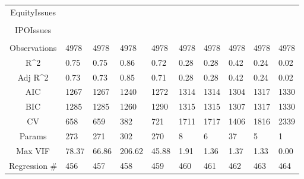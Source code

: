 \documentclass{article}
\begin{document}
\begin{table}[H]
\begin{tabular}{|clllllllll|}
  EquityIssues &  &  &  &  &  &  &  &  &  \\ 
   &  &  &  &  &  &  &  &  &  \\ 
  IPOIssues &  &  &  &  &  &  &  &  &  \\ 
   &  &  &  &  &  &  &  &  &  \\ 
  \hline 
 Observations & 4978 & 4978 & 4978 & 4978 & 4978 & 4978 & 4978 & 4978 & 4978 \\ 
  R^2 & 0.75 & 0.75 & 0.86 & 0.72 & 0.28 & 0.28 & 0.42 & 0.24 & 0.02 \\ 
  Adj R^2 & 0.73 & 0.73 & 0.85 & 0.71 & 0.28 & 0.28 & 0.42 & 0.24 & 0.02 \\ 
  AIC & 1267 & 1267 & 1240 & 1272 & 1314 & 1314 & 1304 & 1317 & 1330 \\ 
  BIC & 1285 & 1285 & 1260 & 1290 & 1315 & 1315 & 1307 & 1317 & 1330 \\ 
  CV & 658 & 659 & 382 & 721 & 1711 & 1717 & 1406 & 1816 & 2339 \\ 
  Params & 273 & 271 & 302 & 270 & 8 & 6 & 37 & 5 & 1 \\ 
  Max VIF & 78.37 & 66.86 & 206.62 & 45.88 & 1.91 & 1.36 & 1.37 & 1.33 & 0.00 \\ 
  Regression \# & 456 & 457 & 458 & 459 & 460 & 461 & 462 & 463 & 464 \\ 
   \hline
\end{tabular}
 
\end{table}
\end{document}
